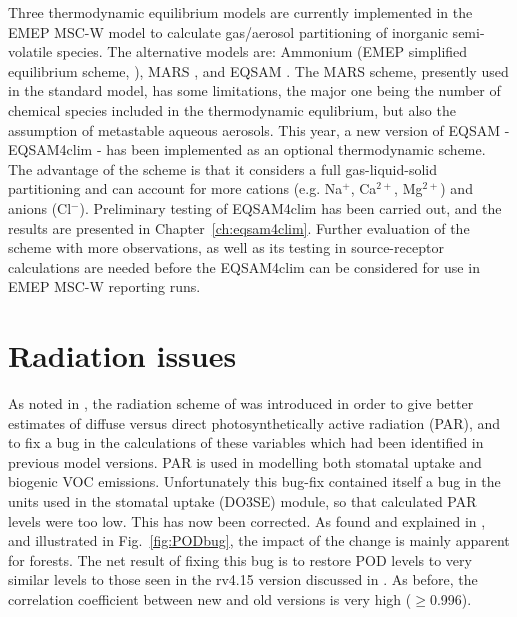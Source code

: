 Three thermodynamic equilibrium models are currently implemented in
the EMEP MSC-W model to calculate gas/aerosol partitioning of
inorganic semi-volatile species. The alternative models are:
Ammonium (EMEP simplified equilibrium scheme, \citealt{Hov:NOx}), MARS
\citep{BinkowskiShankar:1995}, and EQSAM \citep{Metzger2007}. The
MARS scheme, presently used in the standard model, has some
limitations, the major one being the number of chemical species
included in the thermodynamic equlibrium, but also the assumption of
metastable aqueous aerosols. This year, a new version of EQSAM -
EQSAM4clim \citep{Metzger:2016} - has been implemented as an
optional thermodynamic scheme. The advantage of the scheme is that it
considers a full gas-liquid-solid partitioning and can account
for more cations (e.g. Na$^{+}$, Ca$^{2+}$, Mg$^{2+}$) and anions
(Cl$^{-}$). Preliminary testing of EQSAM4clim has been carried out,
and the results are presented in Chapter~\ref{ch:eqsam4clim}. Further
evaluation of the scheme with more observations, as well as its
testing in source-receptor calculations are needed before the
EQSAM4clim can be considered for use in EMEP MSC-W reporting runs.


\section{Radiation issues}
\label{sec:PAR}


As noted in \citet{R2018:ModDev}, the radiation scheme of
\citet{WeissNorman1985} was introduced in order to give better estimates
of diffuse versus direct photosynthetically active radiation (PAR), and to fix a
bug in the calculations of these variables which had been identified in
previous model versions.  PAR is used in modelling both stomatal uptake and
biogenic VOC emissions.  Unfortunately this bug-fix contained itself a
bug in the units used in the stomatal uptake (DO3SE) module, so that calculated PAR levels were too low. This
has now been corrected.  As found and explained in  \citet{R2018:ModDev},
and illustrated in  Fig.~\ref{fig:PODbug}, the impact
of the change is mainly apparent for forests.
The net result of fixing this bug is to restore POD levels to very
similar levels to those seen in the rv4.15 version discussed in \citet{R2018:ModDev}.
As before, the correlation coefficient between new and old versions is very high ($\ge$0.996).

